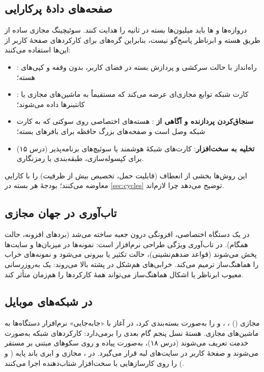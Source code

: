 \documentclass[11pt,a4paper]{article}
\begin{document}
\subsection{صفحه‌های دادهٔ پرکارایی}
دروازه‌ها و ها باید میلیون‌ها بسته در ثانیه را هدایت کنند. سوئیچینگ مجازی ساده از طریق هسته و ابرناظر پاسخ‌گو
نیست، بنابراین گره‌های  برای کارکردهای صفحهٔ کاربر از این‌ها استفاده می‌کنند:
\begin{itemize}
  \item \textbf{}: راه‌انداز با حالت سرکشی و پردازش بسته در فضای کاربر، بدون وقفه و کپی‌های هسته؛
  \item \textbf{}: کارت شبکه توابع مجازی‌ای عرضه می‌کند که مستقیماً به ماشین‌های مجازی یا کانتینرها داده می‌شوند؛
  \item \textbf{سنجاق‌کردن پردازنده و آگاهی از }: هسته‌های اختصاصی روی سوکتی که به کارت شبکه وصل است و صفحه‌های
        بزرگ حافظه برای بافرهای بسته؛
  \item \textbf{تخلیه به سخت‌افزار}: کارت‌های شبکهٔ هوشمند یا سوئیچ‌های برنامه‌پذیر (درس ۱۵) برای کپسوله‌سازی، طبقه‌بندی یا
        رمزنگاری.
\end{itemize}
این روش‌ها بخشی از انعطاف  (قابلیت حمل، تخصیص بیش از ظرفیت) را با کارایی معاوضه می‌کنند؛ بودجهٔ هر بسته در
\cref{sec:cycles} توضیح می‌دهد چرا لازم‌اند.

\subsection{تاب‌آوری در جهان مجازی}
در یک دستگاه اختصاصی، افزونگی درون جعبه ساخته می‌شد (بردهای افزونه، حالت همگام). در  تاب‌آوری ویژگی طراحی
نرم‌افزار است: نمونه‌ها در میزبان‌ها و سایت‌ها پخش می‌شوند (قواعد ضدهم‌نشینی)، حالت تکثیر یا بیرونی می‌شود و نمونه‌های خراب
را هماهنگ‌ساز ترمیم می‌کند. خرابی‌های هم‌شکل در پشته بالا می‌روند: یک به‌روزرسانی معیوب ابرناظر یا اشکال هماهنگ‌ساز می‌تواند
همهٔ کارکردها را هم‌زمان متأثر کند.

\subsection{ در شبکه‌های موبایل}
 مجازی () ، ،  و  را به‌صورت  بسته‌بندی کرد، در آغاز
با «جابه‌جایی» نرم‌افزار دستگاه‌ها به ماشین‌های مجازی. هستهٔ نسل پنجم گام بعدی را برمی‌دارد: کارکردهای شبکه به‌صورت خدمت
تعریف می‌شوند (درس ۱۸)، به‌صورت  پیاده و روی سکوهای مبتنی بر  مستقر می‌شوند و صفحهٔ کاربر در
سایت‌های لبه قرار می‌گیرد. در ،  مجازی و ابری باند پایه ( و ) را روی کارسازهایی با
سخت‌افزار شتاب‌دهنده اجرا می‌کنند.
\end{document}

